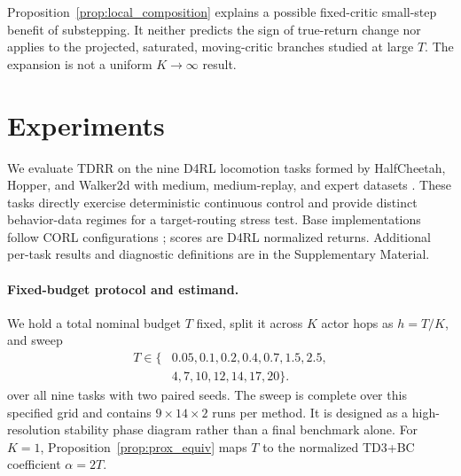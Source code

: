 \documentclass[letterpaper]{article}
\begin{document}
Proposition~\ref{prop:local_composition} explains a possible fixed-critic
small-step benefit of substepping. It neither predicts the sign of true-return
change nor applies to the projected, saturated, moving-critic branches studied
at large $T$. The expansion is not a uniform $K\to\infty$ result.

\section{Experiments}
\label{sec:experiments}

We evaluate TDRR on the nine D4RL locomotion tasks formed by HalfCheetah,
Hopper, and Walker2d with medium, medium-replay, and expert datasets
\citep{fu2020d4rl}. These tasks directly exercise deterministic continuous
control and provide distinct behavior-data regimes for a target-routing stress
test. Base implementations follow CORL configurations
\citep{tarasov2022corl}; scores are D4RL normalized returns. Additional
per-task results and diagnostic definitions are in
the Supplementary Material.

\paragraph{Fixed-budget protocol and estimand.}
We hold a total nominal budget $T$ fixed, split it across $K$ actor hops as
$h=T/K$, and sweep
\begin{equation*}
\begin{split}
T\in\{&0.05,0.1,0.2,0.4,0.7,1.5,2.5,\\
      &4,7,10,12,14,17,20\}.
\end{split}
\end{equation*}
over all nine tasks with two paired seeds. The sweep is complete over this
specified grid and contains $9\times14\times2$ runs per method. It is designed
as a high-resolution stability phase diagram rather than a final benchmark
alone. For $K=1$, Proposition~\ref{prop:prox_equiv} maps $T$ to the normalized
TD3+BC coefficient $\alpha=2T$.
\end{document}
